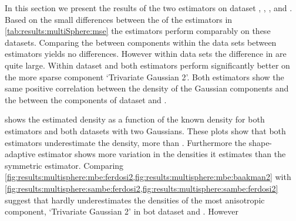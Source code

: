 In this section we present the results of the two estimators on dataset \ferdosiTwo, \baakmanTwo, \ferdosiThree, and \baakmanThree.
	Based on the small differences between the \mses of the estimators in \cref{tab:results:multiSphere:mse} the estimators perform comparably on these datasets. 
	Comparing the \MSE between components within the data sets between estimators yields no differences. However within data sets the difference in \mses are quite large.
	Within dataset \ferdosiTwo and \baakmanTwo both estimators perform significantly better on the more sparse component `Trivariate Gaussian 2'.
	Both estimators show the same positive correlation between the density of the Gaussian components and the \MSE between the components of dataset \ferdosiThree and \baakmanThree.


	 shows the estimated density as a function of the known density for both estimators and both datasets with two Gaussians. These plots show that both estimators underestimate the density, \mbe more than \sambe. Furthermore the shape-adaptive estimator shows more variation in the densities it estimates than the symmetric estimator. 
	Comparing \cref{fig:results:multisphere:mbe:ferdosi2,fig:results:multisphere:mbe:baakman2} with \cref{fig:results:multisphere:sambe:ferdosi2,fig:results:multisphere:sambe:ferdosi2} suggest that \sambe hardly underestimates the densities of the most anisotropic component, \ie `Trivariate Gaussian 2' in bot dataset \ferdosiTwo and \baakmanTwo. However 

